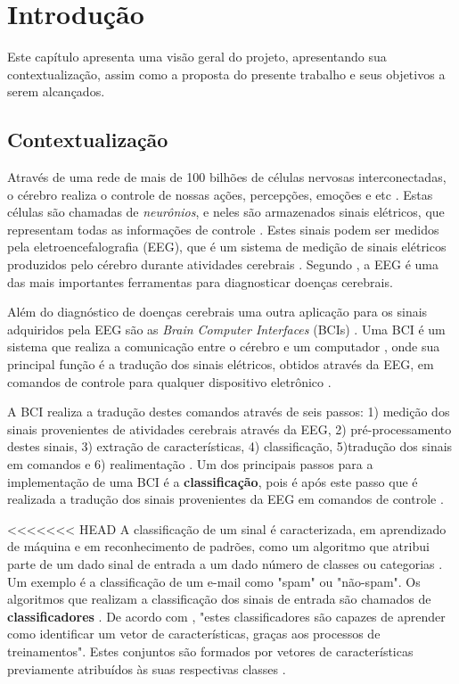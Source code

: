 \chapter[Introdução]{Introdução}

Este capítulo apresenta uma visão geral do projeto, apresentando sua contextualização, assim como a proposta do presente trabalho e seus objetivos a serem alcançados.

\section{Contextualização}

Através de uma rede de mais de 100 bilhões de células nervosas interconectadas, o cérebro
realiza o controle de nossas ações, percepções, emoções e etc \cite{KANDEL}. Estas células
são chamadas de \textit{neurônios}, e neles são armazenados sinais elétricos, que representam
todas as informações de controle \cite{Siulybook}. Estes sinais podem ser medidos pela
eletroencefalografia (EEG), que é um sistema de medição de sinais elétricos produzidos pelo
cérebro durante atividades cerebrais \cite{F.Lotte}. Segundo \cite{SIULYDissertacao}, a EEG
é uma das mais importantes ferramentas para diagnosticar doenças cerebrais.

Além do diagnóstico de doenças cerebrais uma outra aplicação para os sinais adquiridos
pela EEG são as \textit{Brain Computer Interfaces} (BCIs) \cite{F.Lotte}. Uma BCI é um
sistema que realiza a comunicação entre o cérebro e um computador \cite{Siulybook}, onde
sua principal função é a tradução dos sinais elétricos, obtidos através da EEG, em comandos
de controle para qualquer dispositivo eletrônico \cite{Siulybook}.

A BCI realiza a tradução destes comandos através de seis passos: 1) medição dos sinais
provenientes de atividades cerebrais através da EEG, 2) pré-processamento destes sinais,
3) extração de características, 4) classificação, 5)tradução dos sinais em comandos e 6)
realimentação \cite{MasonAndBirch}. Um dos principais passos para a implementação de uma
BCI é a \textbf{classificação}, pois é após este passo que é realizada a tradução dos sinais provenientes da EEG
em comandos de controle \cite{MasonAndBirch}.

<<<<<<< HEAD
A classificação de um sinal é caracterizada, em aprendizado de máquina e em reconhecimento de
padrões, como um algoritmo que atribui parte de um dado sinal de entrada a um dado número de
classes ou categorias \cite{brunelli2009template}. Um exemplo é a classificação de um e-mail
como "spam" ou "não-spam". Os algoritmos que realizam a classificação dos sinais de entrada são
chamados de \textbf{classificadores} \cite{Siulybook}. De acordo com \cite[p. 41]{lottephd}, "estes
classificadores são capazes de aprender como identificar um vetor de características, graças
aos processos de treinamentos". Estes conjuntos são formados por vetores de características
previamente atribuídos às suas respectivas classes \cite{lottephd}.

